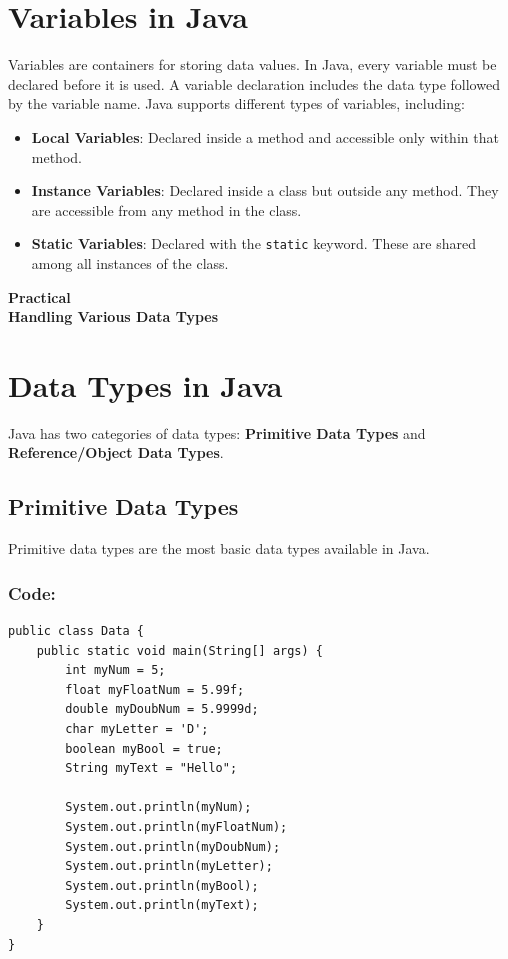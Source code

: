 \documentclass[a4paper,12pt]{article}
\newcounter{practicalno} %
\newcommand{\practicaltitle}[1]{
    \stepcounter{practicalno} %
    \newpage
    \begin{center}
        \vspace{1cm}
        \Large\textbf{Practical \thepracticalno} \\
        \vspace{0.5cm}
        \Large\textbf{#1} %
        \normalsize\vspace{1cm}
    \end{center}
}
\begin{document}
\section{Variables in Java}
Variables are containers for storing data values. In Java, every variable must be declared before it is used. A variable declaration includes the data type followed by the variable name. Java supports different types of variables, including:
\begin{itemize}[leftmargin=2cm]
    \item \textbf{Local Variables}: Declared inside a method and accessible only within that method.
    \item \textbf{Instance Variables}: Declared inside a class but outside any method. They are accessible from any method in the class.
    \item \textbf{Static Variables}: Declared with the \texttt{static} keyword. These are shared among all instances of the class.
\end{itemize}


\setcounter{section}{0}
\practicaltitle{Handling Various Data Types}

\section{Data Types in Java}
Java has two categories of data types: \textbf{Primitive Data Types} and \textbf{Reference/Object Data Types}.

\subsection{Primitive Data Types}
Primitive data types are the most basic data types available in Java.
\subsubsection{Code: }
\begin{lstlisting}
public class Data {
    public static void main(String[] args) {
        int myNum = 5;               
        float myFloatNum = 5.99f;
        double myDoubNum = 5.9999d;  
        char myLetter = 'D';        
        boolean myBool = true;       
        String myText = "Hello";     

        System.out.println(myNum);
        System.out.println(myFloatNum);
        System.out.println(myDoubNum);
        System.out.println(myLetter);
        System.out.println(myBool);
        System.out.println(myText);
    }
}
\end{lstlisting}
\end{document}
